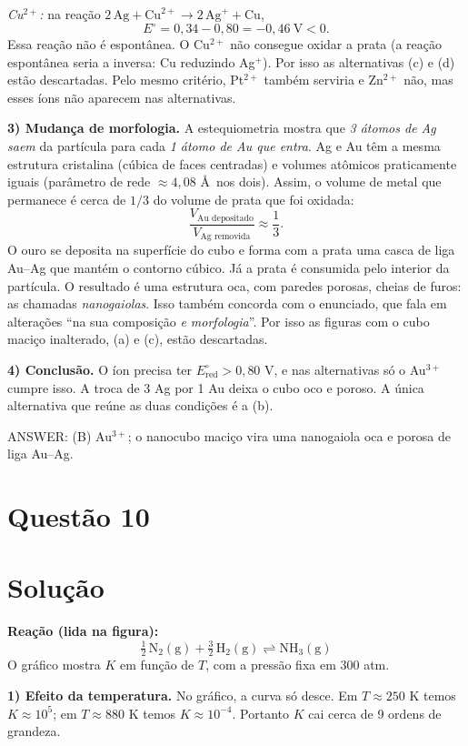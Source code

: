 \documentclass{article}%
\begin{document}
\emph{Cu$^{2+}$:} na reação $2\,\text{Ag}+\text{Cu}^{2+}\rightarrow 2\,\text{Ag}^{+}+\text{Cu}$,
\[
E^\circ=0{,}34-0{,}80=-0{,}46\ \text{V}<0 .
\]
Essa reação não é espontânea. O Cu$^{2+}$ não consegue oxidar a prata (a reação espontânea seria a inversa: Cu reduzindo Ag$^{+}$). Por isso as alternativas (c) e (d) estão descartadas. Pelo mesmo critério, Pt$^{2+}$ também serviria e Zn$^{2+}$ não, mas esses íons não aparecem nas alternativas.

\textbf{3) Mudança de morfologia.} A estequiometria mostra que \emph{3 átomos de Ag saem} da partícula para cada \emph{1 átomo de Au que entra}. Ag e Au têm a mesma estrutura cristalina (cúbica de faces centradas) e volumes atômicos praticamente iguais (parâmetro de rede $\approx 4{,}08$ \AA\ nos dois). Assim, o volume de metal que permanece é cerca de $1/3$ do volume de prata que foi oxidada:
\[
\frac{V_{\text{Au depositado}}}{V_{\text{Ag removida}}}\approx\frac{1}{3}.
\]
O ouro se deposita na superfície do cubo e forma com a prata uma casca de liga Au--Ag que mantém o contorno cúbico. Já a prata é consumida pelo interior da partícula. O resultado é uma estrutura oca, com paredes porosas, cheias de furos: as chamadas \emph{nanogaiolas}. Isso também concorda com o enunciado, que fala em alterações ``na sua composição \emph{e morfologia}''. Por isso as figuras com o cubo maciço inalterado, (a) e (c), estão descartadas.

\textbf{4) Conclusão.} O íon precisa ter $E^\circ_{\text{red}}>0{,}80$ V, e nas alternativas só o Au$^{3+}$ cumpre isso. A troca de 3 Ag por 1 Au deixa o cubo oco e poroso. A única alternativa que reúne as duas condições é a (b).

\medskip
ANSWER: (B) Au$^{3+}$; o nanocubo maciço vira uma nanogaiola oca e porosa de liga Au--Ag.%
\newpage%
\section*{Questão 10}

\section*{Solução}

\textbf{Reação (lida na figura):}
\[
\tfrac{1}{2}\,\mathrm{N_2(g)} + \tfrac{3}{2}\,\mathrm{H_2(g)} \rightleftharpoons \mathrm{NH_3(g)}
\]
O gráfico mostra $K$ em função de $T$, com a pressão fixa em 300 atm.

\medskip
\textbf{1) Efeito da temperatura.}
No gráfico, a curva só desce. Em $T \approx 250$ K temos $K \approx 10^{5}$; em $T \approx 880$ K temos $K \approx 10^{-4}$. Portanto $K$ cai cerca de 9 ordens de grandeza.
\end{document}

